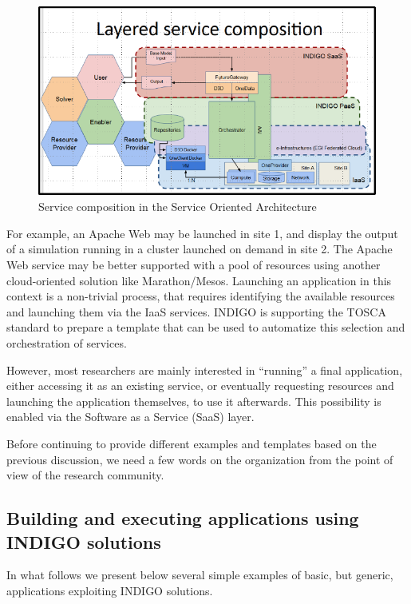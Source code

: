 \documentclass{article}
\begin{document}
{\begin{figure}
  \centering
  \includegraphics[width=\textwidth]{./figs/Figure11.pdf}
  \caption{Service composition in the Service Oriented Architecture}
  \label{fig:11}
\end{figure}


For example, an Apache Web may be launched in site 1, and display the output of a simulation running in a cluster launched on demand in site 2. The Apache Web service may be better supported with a pool of resources using another cloud-oriented solution like Marathon/Mesos.   Launching an application in this context is a non-trivial process, that requires identifying the available resources and launching them via the IaaS services. INDIGO is supporting the TOSCA standard to prepare a template that can be used to automatize this selection and orchestration of services.

However, most researchers are mainly interested in “running” a final application, either accessing it as an existing service, or eventually requesting resources and launching the application themselves, to use it afterwards. This possibility is enabled via the Software as a Service (SaaS) layer.

Before continuing to provide different examples and templates based on the previous discussion, we need a few words on the organization from the point of view of the research community.

\subsection{Building and executing applications using INDIGO solutions}


In what follows we present below several simple examples of basic, but generic, applications exploiting INDIGO solutions. 

}
\end{document}
